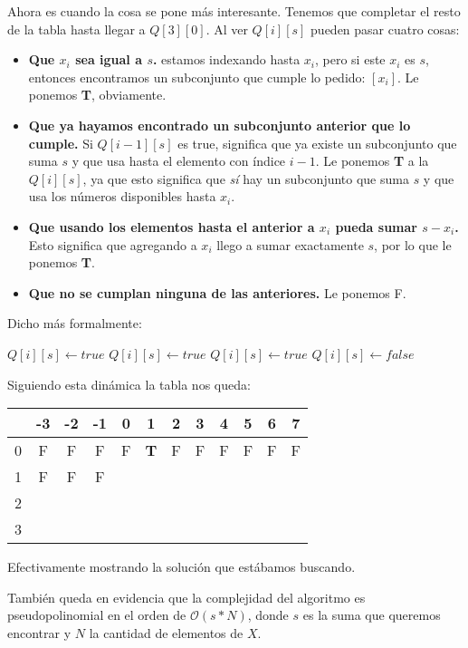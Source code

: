 \newpage
Ahora es cuando la cosa se pone m\'as interesante. Tenemos que completar el resto de la tabla hasta llegar a $Q[3][0]$. Al ver $Q[i][s]$ pueden pasar cuatro cosas:

\begin{itemize}
\item \textbf{Que $x_i$ sea igual a $s$.} estamos indexando hasta $x_i$, pero si este $x_i$ es $s$, entonces encontramos un subconjunto que cumple lo pedido: $[x_i]$. Le ponemos \textbf{T}, obviamente.
\item \textbf{Que ya hayamos encontrado un subconjunto anterior que lo cumple.} Si $Q[i-1][s]$ es true, significa que ya existe un subconjunto que suma $s$ y que usa hasta el elemento con \'indice $i-1$. Le ponemos \textbf{T} a la $Q[i][s]$, ya que esto significa que \emph{s\'i} hay un subconjunto que suma $s$ y que usa los n\'umeros disponibles hasta $x_i$.
\item \textbf{Que usando los elementos hasta el anterior a $x_i$ pueda sumar $s-x_i$.} Esto significa que agregando a $x_i$ llego a sumar exactamente $s$, por lo que le ponemos \textbf{T}.
\item \textbf{Que no se cumplan ninguna de las anteriores.} Le ponemos F.
\end{itemize}

Dicho m\'as formalmente:

\begin{algorithm}
\begin{algorithmic}[1]
      \State $Q[i][s] \gets true$
      \State $Q[i][s] \gets true$
      \State $Q[i][s] \gets true$
    \Else
      \State $Q[i][s] \gets false$
    \EndIf
  \EndFor
\EndFor
\end{algorithmic}
\end{algorithm}

Siguiendo esta din\'amica la tabla nos queda:

\begin{center}
  \begin{tabular}{ | c | c | c | c | c | c | c | c | c | c | c | c | }
    \hline
      & -3 & -2 & -1 & 0 & 1 & 2 & 3 & 4 & 5 & 6 & 7 \\ \hline
    0 &  F & F  &  F & F & \textbf{T}  & F  &  F & F  & F  & F  & F  \\ \hline
    1 &  F & F  &  F &   &   &   &   &   &   &   &   \\ \hline
    2 &    &    &    &   &   &   &   &   &   &   &   \\ \hline
    3 &    &    &    &   &   &   &   &   &   &   &   \\ \hline
  \end{tabular}
\end{center}

Efectivamente mostrando la soluci\'on que est\'abamos buscando.

Tambi\'en queda en evidencia que la complejidad del algoritmo es pseudopolinomial en el orden de $\mathcal{O}(s*N)$, donde $s$ es la suma que queremos encontrar y $N$ la cantidad de elementos de $X$.